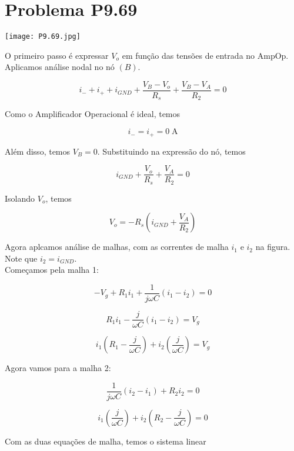 \section*{Problema P9.69}

\renewcommand*\thesection{9.69}

\begin{center}
    \texttt{[image: P9.69.jpg]}
\end{center}

O primeiro passo é expressar $V_o$ em função das tensões de entrada no AmpOp.
Aplicamos análise nodal no nó $(B)$.

\[ i_- + i_+ + i_{GND} + \frac{V_B - V_o}{R_s} + \frac{V_B - V_A}{R_2} = 0 \]

Como o Amplificador Operacional é ideal, temos

\begin{equation}\label{eq:9.69.1}
    i_- = i_+ = 0 \; \textrm{A}
\end{equation}

Além disso, temos $V_B = 0$. Substituindo na expressão do nó, temos

\[ i_{GND} + \frac{V_o}{R_s} + \frac{V_A}{R_2} = 0 \]

Isolando $V_o$, temos

\begin{equation}\label{eq:9.69.2}
    V_o = - R_s\left(i_{GND} + \frac{V_A}{R_2}\right)
\end{equation}

Agora aplcamos análise de malhas, com as correntes de malha $i_1$ e $i_2$ na figura. Note que $i_2 = i_{GND}$. \\
Começamos pela malha 1:

\[ -V_g + R_1i_1 + \frac{1}{j\omega C}(i_1 - i_2) = 0 \]

\[ R_1i_1 - \frac{j}{\omega C}(i_1 - i_2) = V_g \]

\[ i_1\left(R_1 - \frac{j}{\omega C}\right) + i_2\left(\frac{j}{\omega C}\right) = V_g \]

Agora vamos para a malha 2:

\[ \frac{1}{j\omega C}(i_2 - i_1) + R_2i_2 = 0 \]

\[ i_1\left(\frac{j}{\omega C}\right) + i_2\left(R_2 - \frac{j}{\omega C}\right) = 0 \]

Com as duas equações de malha, temos o sistema linear

\begingroup
\renewcommand*{\arraystretch}{3}

